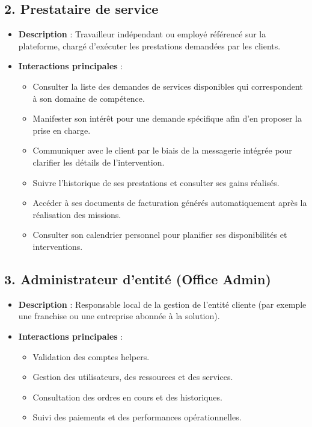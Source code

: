 \subsection*{2. Prestataire de service }
\begin{itemize}
  \item \textbf{Description} : Travailleur indépendant ou employé référencé sur la plateforme, chargé d’exécuter les prestations demandées par les clients.
  \item \textbf{Interactions principales} :
    \begin{itemize}
        \item Consulter la liste des demandes de services disponibles qui correspondent à son domaine de compétence.
        \item Manifester son intérêt pour une demande spécifique afin d’en proposer la prise en charge.
        \item Communiquer avec le client par le biais de la messagerie intégrée pour clarifier les détails de l’intervention.
        \item Suivre l’historique de ses prestations et consulter ses gains réalisés.
        \item Accéder à ses documents de facturation générés automatiquement après la réalisation des missions.
        \item Consulter son calendrier personnel pour planifier ses disponibilités et interventions.
    \end{itemize}
\end{itemize}

\subsection*{3. Administrateur d’entité (Office Admin)}
\begin{itemize}
  \item \textbf{Description} : Responsable local de la gestion de l’entité cliente (par exemple une franchise ou une entreprise abonnée à la solution).
  \item \textbf{Interactions principales} :
    \begin{itemize}
        \item Validation des comptes helpers.
        \item Gestion des utilisateurs, des ressources et des services.
        \item Consultation des ordres en cours et des historiques.
        \item Suivi des paiements et des performances opérationnelles.
    \end{itemize}
\end{itemize}

